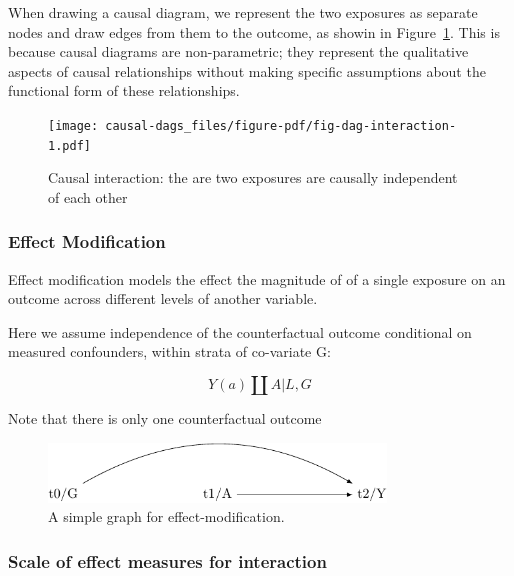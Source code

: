 \documentclass[
  singlecolumn]{report}
\begin{document}
When drawing a causal diagram, we represent the two exposures as
separate nodes and draw edges from them to the outcome, as showin in
Figure~\ref{fig-dag-interaction}. This is because causal diagrams are
non-parametric; they represent the qualitative aspects of causal
relationships without making specific assumptions about the functional
form of these relationships.

\begin{figure}

{\centering \texttt{[image: causal-dags\_files/figure-pdf/fig-dag-interaction-1.pdf]}

}

\caption{\label{fig-dag-interaction}Causal interaction: the are two
exposures are causally independent of each other}

\end{figure}

\hypertarget{effect-modification}{%
\subsubsection{\texorpdfstring{\textbf{Effect
Modification}}{Effect Modification}}\label{effect-modification}}

Effect modification models the effect the magnitude of of a single
exposure on an outcome across different levels of another variable.

Here we assume independence of the counterfactual outcome conditional on
measured confounders, within strata of co-variate G:

\[Y(a) \coprod A | L, G\]

Note that there is only one counterfactual outcome

\begin{figure}

{\centering \includegraphics[width=0.8\textwidth,height=\textheight]{causal-dags_files/figure-pdf/fig-dag-effect-modfication-1.pdf}

}

\caption{\label{fig-dag-effect-modfication}A simple graph for
effect-modification.}

\end{figure}

\hypertarget{scale-of-effect-measures-for-interaction}{%
\subsubsection{\texorpdfstring{\textbf{Scale of effect measures for
interaction}}{Scale of effect measures for interaction}}\label{scale-of-effect-measures-for-interaction}}
\end{document}
